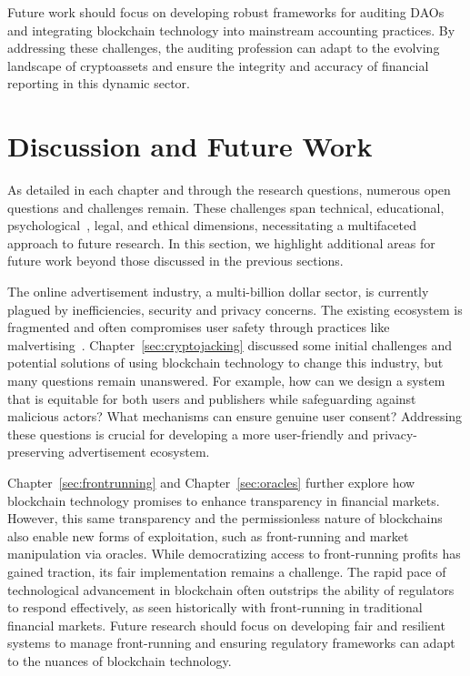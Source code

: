 Future work should focus on developing robust frameworks for auditing DAOs and integrating blockchain technology into mainstream accounting practices. By addressing these challenges, the auditing profession can adapt to the evolving landscape of cryptoassets and ensure the integrity and accuracy of financial reporting in this dynamic sector.


\section{Discussion and Future Work}

As detailed in each chapter and through the research questions, numerous open questions and challenges remain. These challenges span technical, educational, psychological~\cite{gaggioli2019middleman}, legal, and ethical dimensions, necessitating a multifaceted approach to future research. In this section, we highlight additional areas for future work beyond those discussed in the previous sections.

The online advertisement industry, a multi-billion dollar sector, is currently plagued by inefficiencies, security and privacy concerns. The existing ecosystem is fragmented and often compromises user safety through practices like malvertising~\cite{li2012knowing}. Chapter~\ref{sec:cryptojacking} discussed some initial challenges and potential solutions of using blockchain technology to change this industry, but many questions remain unanswered. For example, how can we design a system that is equitable for both users and publishers while safeguarding against malicious actors? What mechanisms can ensure genuine user consent? Addressing these questions is crucial for developing a more user-friendly and privacy-preserving advertisement ecosystem.

Chapter~\ref{sec:frontrunning} and Chapter~\ref{sec:oracles} further explore how blockchain technology promises to enhance transparency in financial markets. However, this same transparency and the permissionless nature of blockchains also enable new forms of exploitation, such as front-running and market manipulation via oracles. While democratizing access to front-running profits has gained traction, its fair implementation remains a challenge. The rapid pace of technological advancement in blockchain often outstrips the ability of regulators to respond effectively, as seen historically with front-running in traditional financial markets. Future research should focus on developing fair and resilient systems to manage front-running and ensuring regulatory frameworks can adapt to the nuances of blockchain technology.

